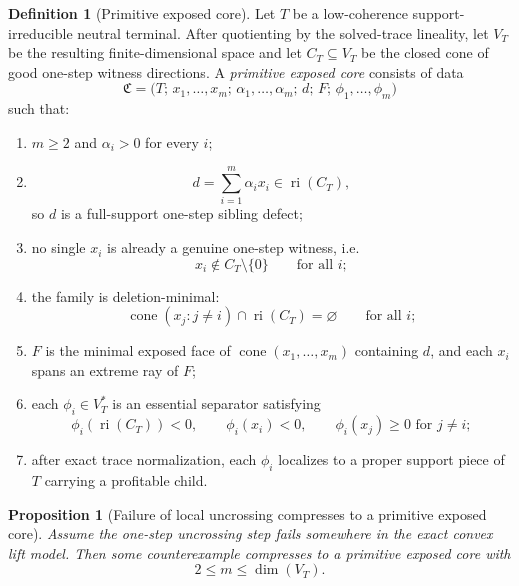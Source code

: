 \documentclass[11pt]{article}
\newtheorem{proposition}[theorem]{Proposition}
\theoremstyle{definition}
\newtheorem{definition}[theorem]{Definition}
\newcommand{\1}{\mathbf{1}}
\begin{document}
\begin{definition}[Primitive exposed core]\label{def:primitive-exposed-core}
Let $T$ be a low-coherence support-irreducible neutral terminal.
After quotienting by the solved-trace lineality, let $V_T$ be the resulting finite-dimensional space and let $C_T\subseteq V_T$ be the closed cone of good one-step witness directions.
A \emph{primitive exposed core} consists of data
\[
\mathfrak C=\bigl(T;\,x_1,\dots,x_m;\,\alpha_1,\dots,\alpha_m;\,d;\,F;\,\phi_1,\dots,\phi_m\bigr)
\]
such that:
\begin{enumerate}[label=(\roman*),leftmargin=2.2em]
\item $m\ge 2$ and $\alpha_i>0$ for every $i$;
\item
\[
d=\sum_{i=1}^m \alpha_i x_i\in \operatorname{ri}(C_T),
\]
so $d$ is a full-support one-step sibling defect;
\item no single $x_i$ is already a genuine one-step witness, i.e.
\[
x_i\notin C_T\setminus \{0\}
\qquad\text{for all }i;
\]
\item the family is deletion-minimal:
\[
\operatorname{cone}(x_j:j\neq i)\cap \operatorname{ri}(C_T)=\varnothing
\qquad\text{for all }i;
\]
\item $F$ is the minimal exposed face of $\operatorname{cone}(x_1,\dots,x_m)$ containing $d$, and each $x_i$ spans an extreme ray of $F$;
\item each $\phi_i\in V_T^*$ is an essential separator satisfying
\[
\phi_i(\operatorname{ri}(C_T))<0,
\qquad
\phi_i(x_i)<0,
\qquad
\phi_i(x_j)\ge 0 \text{ for }j\neq i;
\]
\item after exact trace normalization, each $\phi_i$ localizes to a proper support piece of $T$ carrying a profitable child.
\end{enumerate}
\end{definition}

\begin{proposition}[Failure of local uncrossing compresses to a primitive exposed core]\label{prop:primitive-core-reduction}
Assume the one-step uncrossing step fails somewhere in the exact convex lift model.
Then some counterexample compresses to a primitive exposed core with
\[
2\le m\le \dim(V_T).
\]
\end{proposition}
\end{document}
